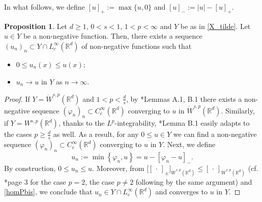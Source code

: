 \documentclass[letterpaper, 11pt,  reqno]{amsart}
\theoremstyle{definition}
\newtheorem{proposition}{Proposition}[section]
\theoremstyle{remark}
\numberwithin{equation}{section}
\newcommand{\bbr}{\mathbb{R}}
\newcommand{\R}{{\mathbb R}}
\begin{document}
In what follows, we define $[u]_{+}:=\max\{u,0\}$ and $[u]_{-}:=|u|-[u]_{+}$.
	\begin{proposition}\label{one_sided_approx}
		Let $d\ge 1$,  $0<s<1$, $1<p<\infty$ and $Y$ be as in \eqref{X_tilde}. Let  $u \in Y$ be a non-negative function.  Then, there exists a sequence $(u_n)_n \subset Y\cap L^{\infty}_{c}(\bbr^d)$ of non-negative functions such that
		\begin{itemize}
			\item[(i)]$0\le u_n(x)\le u(x)$;
			\vspace{1mm}
			\item[(ii)]$u_n\to u$ in $Y$ as $n\to \infty$.
		\end{itemize}
	\end{proposition}
	\begin{proof} If $Y=\dot W^{s,p}(\R^d)$ and $1<p<\frac{d}{s}$,  by \cite{characterisation}*{Lemmas A.1, B.1}  there exists a  non-negative sequence  $(\varphi_n)_n\subset C^{\infty}_{c}(\bbr^d)$ converging to $u$ in $\dot{W}^{s,p}(\bbr^d)$. Similarly, if $Y=W^{s,p}(\R^d)$, thanks to the $L^p$-integrability, \cite{characterisation}*{Lemma B.1} easily adapts to the cases $p\ge \frac{d}{s}$ as well. As a result, for any $0\le u\in Y$ we can find a non-negative sequence  $(\varphi_n)_n\subset C^{\infty}_{c}(\bbr^d)$ converging to $u$ in $Y$. Next, we define \begin{equation*}\label{def_min}
			u_n:=\min\left\{\varphi_n,u\right\}
		=u-{[\varphi_n-u]}_{-}.
		\end{equation*} 
		By construction, $0\le u_n\le u$.
		Moreover, from $\big[[\, \cdot\, ]_{\pm}\big]_{\dot {W}^{s,p}(\bbr^d)}\le [\, \cdot\, ]_{\dot {W}^{s,p}(\bbr^d)}$ (cf.  \cite{Musina}*{page $3$} for the case $p=2$, the case $p\neq 2$ following by the same argument) and \eqref{homPbis},  we conclude that $u_n\in Y\cap L^{\infty}_c(\R^d)$ and  converges to $u$ in $Y$.

\end{proof}
\end{document}
